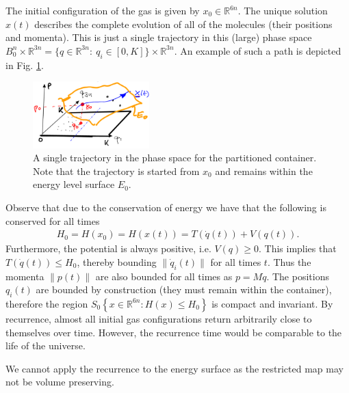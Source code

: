 \begin{ex}
The initial configuration of the gas is given by $x_0\in \mathbb{R}^{6n}$. The unique solution $x(t)$ describes the complete evolution of all of the molecules (their positions and momenta). This is just a single trajectory in this (large) phase space $B_0^{n}\times \mathbb{R}^{3n} = \{q \in \mathbb{R}^{3n}:\ q_i \in [0,K]\} \times \mathbb{R}^{3n}$. An example of such a path is depicted in Fig. \ref{fig:partitioned_gas_path}.
\begin{figure}[h!]
	\centering
	\includegraphics[width=0.4\textwidth]{figures/ch8/15partitioned_container_path.png}
	\caption{A single trajectory in the phase space for the partitioned container. Note that the trajectory is started from $x_0$ and remains within the energy level surface $E_0$.}
	\label{fig:partitioned_gas_path}
\end{figure}
Observe that due to the conservation of energy we have that the following is conserved for all times
\begin{align}
	H_0 = H(x_0) = H(x(t)) = T(\dot{q}(t)) + V(q(t)).
\end{align}
Furthermore, the potential is always positive, i.e. $V(q) \geq 0$. This implies that $T(\dot{q}(t)) \leq H_0$, thereby bounding $\|\dot{q}_i(t)\|$ for all times $t$. Thus the momenta $\|p(t)\|$ are also bounded for all times as $p = M\dot{q}$. The positions $q_i(t)$ are bounded by construction (they must remain within the container), therefore the region $S_0 \left\{ x \in \mathbb{R}^{6n}: H(x) \leq H_0 \right\}$ is compact and invariant. By recurrence, almost all initial gas configurations return arbitrarily close to themselves over time. However, the recurrence time would be comparable to the life of the universe. 
\begin{remark}[]
	We cannot apply the recurrence to the energy surface as the restricted map may not be volume preserving.
\end{remark}
\end{ex}

